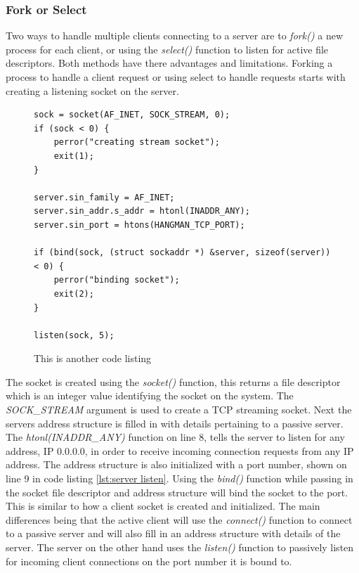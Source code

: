 \documentclass[12pt,a4paper,titlepage]{article}
\begin{document}
\subsubsection{Fork or Select}

Two ways to handle multiple clients connecting to a server are to \textit{fork()} a new process for each client, or using the \textit{select()} function to listen for active file descriptors. Both methods have there advantages and limitations. Forking a process to handle a client request or using select to handle requests starts with creating a listening socket on the server. 

\begin{figure}[H]
\begin{lstlisting}
sock = socket(AF_INET, SOCK_STREAM, 0); 
if (sock < 0) {
	perror("creating stream socket");
	exit(1);
}

server.sin_family = AF_INET;
server.sin_addr.s_addr = htonl(INADDR_ANY);
server.sin_port = htons(HANGMAN_TCP_PORT);

if (bind(sock, (struct sockaddr *) &server, sizeof(server)) < 0) {
	perror("binding socket");
	exit(2);
}

listen(sock, 5);
\end{lstlisting}
	\caption{This is another code listing \cite{stevensunp}}
	\label{code:raig header source}
\end{figure}

The socket is created using the \textit{socket()} function, this returns a file descriptor which is an integer value identifying the socket on the system. The \textit{SOCK\_STREAM} argument is used to create a TCP streaming socket. Next the servers address structure is filled in with details pertaining to a passive server. The \textit{htonl(INADDR\_ANY)} function on line 8, tells the server to listen for any address, IP 0.0.0.0, in order to receive incoming connection requests from any IP address. The address structure is also initialized with a port number, shown on line 9 in code listing \ref{lst:server listen}. Using the \textit{bind()} function while passing in the socket file descriptor and address structure will bind the socket to the port.\\ 

This is similar to how a client socket is created and initialized. The main differences being that the active client will use the \textit{connect()} function to connect to a passive server and will also fill in an address structure with details of the server. The server on the other hand uses the \textit{listen()} function to passively listen for incoming client connections on the port number it is bound to. \\
\end{document}
